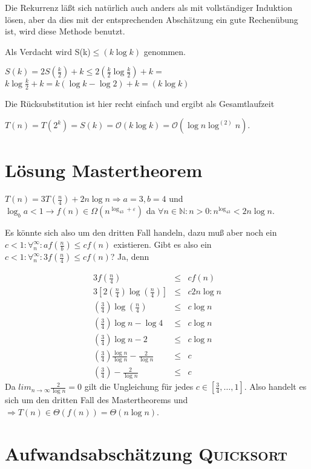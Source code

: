 \documentclass[ngerman,draft,parskip=half*,twoside]{scrreprt}
\theoremstyle{break}
\theoremstyle{nonumberbreak}
\newcommand*{\OO}{\mathcal{O}}      %
\newcommand*{\N}{\mathbb{N}}        %
\begin{document}
Die Rekurrenz läßt sich natürlich auch anders als mit vollständiger Induktion lösen, aber da dies mit der entsprechenden Abschätzung ein
gute Rechenübung ist, wird diese Methode benutzt.

Als Verdacht wird S(k)$\leq(k \log k)$ genommen.


$S(k) = 2 S(\frac{k}{2})+k\leq 2 (\frac{k}{2} \log \frac{k}{2})+k=$
$k \log \frac{k}{2}+k=k (\log k-\log 2)+k=(k \log k)$

Die Rücksubstitution ist hier recht einfach und ergibt als Gesamtlaufzeit

$T(n)=T(2^k)=S(k)=\OO(k \log k)=\OO(\log n \log^{(2)} n)$.

\section{Lösung Mastertheorem}
\label{mastertheorem_Fall3}

$ T(n) = 3 T(\frac{n}{4}) + 2n\log n \Rightarrow a=3,b=4$ und $\log_ba<1 \rightarrow 
f(n) \in \Omega(n^{\log_43+\varepsilon})$ da $\forall n \in \N\colon  n>0\colon  n^{\log_43}<2n\log n$.

Es könnte sich also um den dritten Fall handeln, dazu muß aber noch ein $c < 1 \colon  \forall^{\infty}_{n}\colon 
a f(\frac{n}{b})  \leq c f(n)$ existieren. Gibt es also ein 
$c<1\colon  \forall^{\infty}_{n}\colon  3f(\frac{n}{4}) \leq cf(n)$? Ja, denn

\begin{align*}
3f(\frac{n}{4}) & \leq & c f(n)\\
3[2(\frac{n}{4}) \log (\frac{n}{4})] & \leq & c 2n \log n\\
(\frac{3}{4}) \log (\frac{n}{4}) & \leq & c \log n\\
(\frac{3}{4}) \log n- \log 4 & \leq & c \log n\\
(\frac{3}{4}) \log n- 2 & \leq & c \log n\\
(\frac{3}{4}) \frac{\log n}{\log n}-\frac{2}{\log n} & \leq & c\\
(\frac{3}{4}) -\frac{2}{\log n} & \leq & c
\end{align*}
Da $lim_{n \to \infty} \frac{2}{\log n}=0$ gilt die Ungleichung für jedes $c \in [\frac{3}{4},\ldots,1]$. %
Also handelt es sich um den dritten Fall des Mastertheorems und 
$ \Rightarrow T(n) \in \Theta (f(n))=\Theta (n\log n)$.

\section{Aufwandsabschätzung \textsc{Quicksort}}
\label{quicksort}
\end{document}
